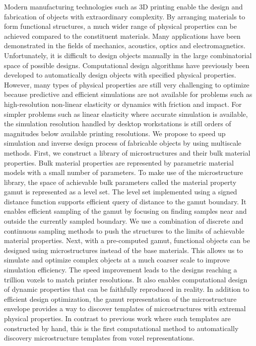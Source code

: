 % 
% 
%
Modern manufacturing technologies such as 3D printing enable the design and fabrication of objects with extraordinary complexity.
By arranging materials to form functional structures, a much wider range of physical properties can be achieved compared to the constituent materials.
Many applications have been demonstrated in the fields of mechanics, acoustics, optics and electromagnetics.
Unfortunately, it is difficult to design objects manually in the large combinatorial space of possible designs.
Computational design algorithms have previously been developed to automatically design objects with specified physical properties.
However, many types of physical properties are still very challenging to optimize because predictive and efficient simulations are not available for 
problems such as high-resolution non-linear elasticity or dynamics with friction and impact.
For simpler problems such as linear elasticity where accurate simulation is available,
the simulation resolution handled by desktop workstations is still orders of magnitudes below available printing resolutions.
We propose to speed up simulation and inverse design process of fabricable objects by using multiscale methods.
First, we construct a library of microstructures and their bulk material properties.
Bulk material properties are represented by parametric material models with a small number of parameters.
To make use of the microstructure library, the space of achievable bulk parameters called the material property gamut is represented as a level set.
The level set implemented using a signed distance function supports efficient query of distance to the gamut boundary. It enables efficient sampling of the gamut by focusing on finding samples near and outside the currently sampled boundary. We use a combination of discrete and continuous sampling methods to push the structures to the limits of achievable material properties.
Next, with a pre-computed gamut, functional objects can be designed using microstructures instead of the base materials.
This allows us to simulate and optimize complex objects at a much coarser scale to improve simulation efficiency. The speed improvement leads to the designs reaching a trillion voxels to match printer resolutions. It also enables computational design of dynamic properties that can be faithfully reproduced in reality.
In addition to efficient design optimization, 
the gamut representation of the microstructure envelope provides a way to discover templates of microstructures with extremal physical properties.
In contrast to previous work where such templates are constructed by hand,
this is the first computational method to automatically discovery microstructure templates from voxel representations.
